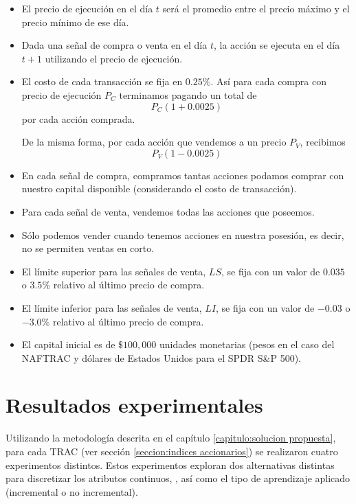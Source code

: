 \documentclass[12pt]{scrbook}
\theoremstyle{break}
\theoremstyle{break}
\begin{document}
\begin{itemize}
\item El precio de ejecución en el día $t$ será el promedio entre el precio máximo y el precio mínimo de ese día.

\item Dada una señal de compra o venta en el día $t$, la acción se ejecuta en el día $t+1$ utilizando el precio de ejecución.

\item El costo de cada transacción se fija en $0.25\%$. Así para cada compra con precio de ejecución $P_{C}$ terminamos pagando un total de 
$$P_{C}(1 + 0.0025)$$
por cada acción comprada.

De la misma forma, por cada acción que vendemos a un precio $P_{V}$, recibimos 
$$P_{V}(1 - 0.0025)$$

\item En cada señal de compra, compramos tantas acciones podamos comprar con nuestro capital disponible (considerando el costo de transacción).

\item Para cada señal de venta, vendemos todas las acciones que poseemos.

\item Sólo podemos vender cuando tenemos acciones en nuestra posesión, es decir, no se permiten ventas en corto.

\item El límite superior para las señales de venta, $LS$, se fija con un valor de $0.035$ o $3.5\%$ relativo al último precio de compra.

\item El límite inferior para las señales de venta, $LI$, se fija con un valor de $-0.03$ o $-3.0\%$ relativo al último precio de compra.

\item El capital inicial es de $\$100,000$ unidades monetarias (pesos en el caso del NAFTRAC y dólares de Estados Unidos para el SPDR S\&P 500).
\end{itemize}

\chapter{Resultados experimentales}
\label{capitulo:resultados experimentales}
Utilizando la metodología descrita en el capítulo \ref{capitulo:solucion propuesta}, para cada TRAC (ver sección \ref{seccion:indices accionarios}) se realizaron cuatro experimentos distintos. Estos experimentos exploran dos alternativas distintas para discretizar los atributos continuos, \cite{dataMiningUsingR}, así como el tipo de aprendizaje aplicado (incremental o no incremental).
\end{document}
